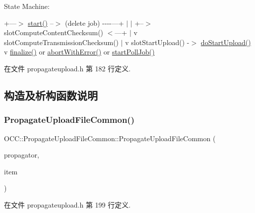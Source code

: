 State Machine\+: 

+---$>$ \hyperlink{class_o_c_c_1_1_propagate_upload_file_common_a588514bbae3f7655a7b9dba85fb6af62}{start()} --$>$ (delete job) -\/-\/-\/-\/---+ $\vert$ $\vert$ +--$>$ slot\+Compute\+Content\+Checksum() $<$---+ $\vert$ v slot\+Compute\+Transmission\+Checksum() $\vert$ v slot\+Start\+Upload() -\/$>$ \hyperlink{class_o_c_c_1_1_propagate_upload_file_common_a7df70722c1bc35b534d7cd1829abe8f5}{do\+Start\+Upload()} v \hyperlink{class_o_c_c_1_1_propagate_upload_file_common_af7ccc7680c669f640ecd3bd40ee5e834}{finalize()} or \hyperlink{class_o_c_c_1_1_propagate_upload_file_common_a713ee758b6e2ee3a0573a355cb96192f}{abort\+With\+Error()} or \hyperlink{class_o_c_c_1_1_propagate_upload_file_common_ae4261f390df2d2ed73a16f0e4fcf71aa}{start\+Poll\+Job()} 

在文件 propagateupload.\+h 第 182 行定义.



\subsection{构造及析构函数说明}
\mbox{\label{class_o_c_c_1_1_propagate_upload_file_common_a2d14665339c7b4d0cdc8f9ff8c45fa66}} 
\subsubsection{\texorpdfstring{Propagate\+Upload\+File\+Common()}{PropagateUploadFileCommon()}}
{\footnotesize\ttfamily O\+C\+C\+::\+Propagate\+Upload\+File\+Common\+::\+Propagate\+Upload\+File\+Common (\begin{DoxyParamCaption}\item[{\hyperlink{class_o_c_c_1_1_owncloud_propagator}{Owncloud\+Propagator} $\ast$}]{propagator,  }\item[{const \hyperlink{namespace_o_c_c_acb6b0db82893659fbd0c98d3c5b8e2b8}{Sync\+File\+Item\+Ptr} \&}]{item }\end{DoxyParamCaption})}



在文件 propagateupload.\+h 第 199 行定义.



